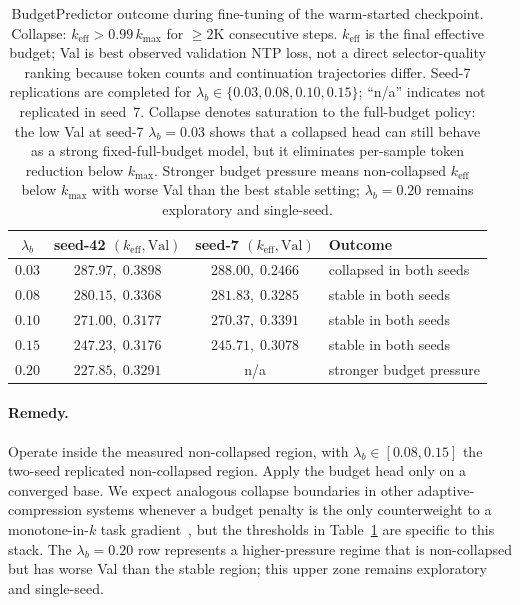 \documentclass[runningheads]{llncs}
\newcommand{\keff}{k_{\mathrm{eff}}}
\newcommand{\kmax}{k_{\max}}
\newcommand{\lbb}{\lambda_b}
\begin{document}
\begin{table}[t]
\caption{BudgetPredictor outcome during fine-tuning of the warm-started
checkpoint. Collapse: $\keff{>}0.99\,\kmax$ for $\geq 2$K consecutive
steps. $\keff$ is the final effective budget; Val is best observed
validation NTP loss, not a direct selector-quality ranking because token
counts and continuation trajectories differ. Seed-7 replications are
completed for $\lbb\in\{0.03,0.08,0.10,0.15\}$; ``n/a'' indicates not
replicated in seed~7. Collapse denotes saturation to the full-budget
policy: the low Val at seed-7 $\lbb{=}0.03$ shows that a collapsed head
can still behave as a strong fixed-full-budget model, but it eliminates
per-sample token reduction below $\kmax$. Stronger budget pressure means
non-collapsed $\keff$ below $\kmax$ with worse Val than the best stable
setting; $\lbb{=}0.20$ remains exploratory and single-seed.}
\label{tab:budget-collapse}
\centering
\small
\renewcommand{\arraystretch}{1.05}
\begin{tabular}{cccl}
\toprule
$\lbb$ & seed-42 $(\keff,\mathrm{Val})$ & seed-7 $(\keff,\mathrm{Val})$ & Outcome \\
\midrule
$0.03$ & $287.97,\;0.3898$ & $288.00,\;0.2466$ & collapsed in both seeds\\
$0.08$ & $280.15,\;0.3368$ & $281.83,\;0.3285$ & stable in both seeds\\
$0.10$ & $271.00,\;0.3177$ & $270.37,\;0.3391$ & stable in both seeds\\
$0.15$ & $247.23,\;0.3176$ & $245.71,\;0.3078$ & stable in both seeds\\
$0.20$ & $227.85,\;0.3291$ & n/a & stronger budget pressure\\
\bottomrule
\end{tabular}
\end{table}

\paragraph{Remedy.}
Operate inside the measured non-collapsed region, with
$\lbb\!\in\![0.08,0.15]$ the two-seed replicated non-collapsed region.
Apply the budget head only on a
converged base. We expect analogous collapse boundaries in other
adaptive-compression systems whenever a budget penalty is the only
counterweight to a monotone-in-$k$ task gradient~\cite{meng2022adavit,rao2021dynamicvit},
but the thresholds in Table~\ref{tab:budget-collapse} are specific to
this stack. The $\lbb{=}0.20$ row represents a higher-pressure regime
that is non-collapsed but has worse Val than the stable region; this
upper zone remains exploratory and single-seed.
\end{document}
